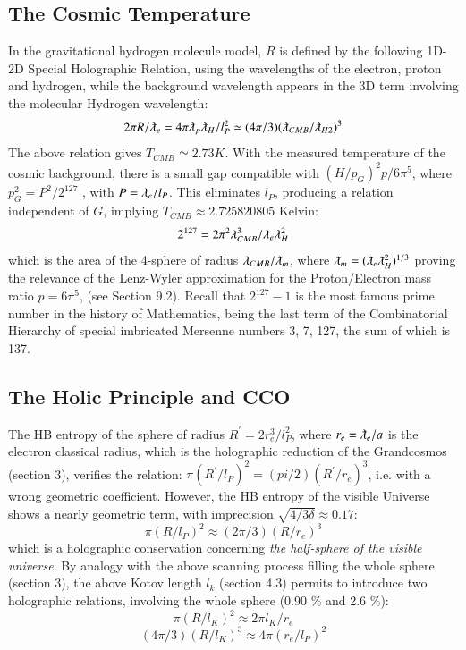 \documentclass[twoside,draft]{article}
\begin{document}
\begin{sloppypar}
\subsection{The Cosmic Temperature}

In the gravitational hydrogen molecule model, $R$ is defined by the following 1D-2D Special
Holographic Relation, using the wavelengths of the electron, proton and hydrogen, while the background wavelength appears in the 3D term involving the molecular Hydrogen wavelength:
\begin{equation}
2 \pi R/\lambdabar_{e} = 4 \pi \lambdabar_{p} \lambdabar_{H} /l_{P}^2 \simeq (4\pi/3)(\lambdabar_{CMB} /\lambdabar_{H2})^{3}
\end{equation}
The above relation gives $T_{CMB} \simeq 2.73 K$. With the measured temperature of the cosmic
background, there is a small gap compatible with $(H/p_G)^2 p/6\pi^5 $, where $p_{G}^{2} = P^{2} /2^{127}$ , with $P = \lambdabar_{e} /l_{P}$. 
This eliminates $l_{P}$, producing a relation independent of $G$, implying $T_{CMB} \approx 2.725820805$ Kelvin:
$$2^{127} = 2\pi^{2} \lambda_{CMB}^{3} /\lambdabar_{e} \lambdabar_{H}^2$$
which is the area of the 4-sphere of radius $\lambda_{CMB} / \lambdabar_{m}$, where $\lambdabar_{m} = (\lambdabar_{e} \lambdabar_{H}^2)^{1/3} $ proving the relevance of
the Lenz-Wyler approximation for the Proton/Electron mass ratio $p = 6\pi^{5}$, (see Section 9.2). Recall
that $2^{127} - 1$ is the most famous prime number in the history of Mathematics, being the last term of
the Combinatorial Hierarchy \cite{Sanchez1} of special imbricated Mersenne numbers 3, 7, 127, the sum of which is 137.

\subsection{The Holic Principle and CCO}

The HB entropy of the sphere of radius $R^{\prime} = 2r_e^3 / l_P^ 2$, where $r_e = \lambdabar_e /a $ is the electron classical radius, which is the holographic reduction of the Grandcosmos (section 3), verifies the relation: $\pi(R^{\prime}/l_P)^2 = (pi/2)(R^{\prime}/r_e)^3 $, i.e. with a wrong geometric coefficient. However, the HB entropy of the visible Universe shows a nearly geometric term, with imprecision $\sqrt{4/3\delta} \approx 0.17$:
\begin{equation}
\pi(R/l_P)^2 \approx (2\pi/3)(R/r_e)^3 
\end{equation}
which is a holographic conservation concerning \textit{the half-sphere of the visible universe}. By analogy with the above scanning process filling the whole sphere (section 3), the above Kotov length $l_k$ (section 4.3) permits to introduce two holographic relations, involving the whole sphere (0.90 \% and 2.6 \%):
\begin{equation}
\pi(R/l_K)^2 \approx 2\pi l_K/r_e 
\end{equation}
\begin{equation}
(4\pi/3)(R/l_K)^3 \approx 4\pi (r_e/l_P)^2 
\end{equation}


\end{sloppypar}
\end{document}
